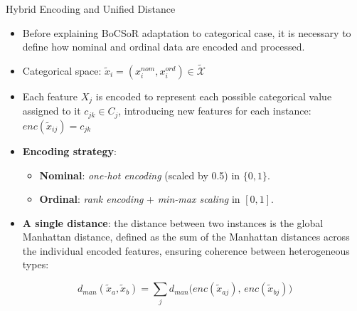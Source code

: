 \documentclass[10pt,aspectratio=169]{beamer}
\begin{document}
\begin{frame}{Hybrid Encoding and Unified Distance}
  \begin{itemize}\small
    \item Before explaining BoCSoR adaptation to categorical case, it is necessary to define how nominal and ordinal data are encoded and processed.
    \item Categorical space: $\tilde{x}_i = (x_i^{nom}, x_i^{ord}) \in \tilde{\mathcal{X}}$
    \item Each feature $X_j$ is encoded to represent each possible categorical value assigned to it $c_{jk} \in C_j$, introducing new features for each instance: $enc(\tilde{x}_{ij}) = c_{jk}$
    \item \textbf{Encoding strategy}:
      \begin{itemize}
        \item \textbf{Nominal}: \emph{one-hot encoding} (scaled by 0.5) in $\{0, 1\}$.
        \item \textbf{Ordinal}: \emph{rank encoding} + \emph{min-max scaling} in $[0, 1]$.
      \end{itemize}
    \item \textbf{A single distance}: the distance between two instances is the global Manhattan distance, defined as the sum of the Manhattan distances across the individual encoded features, ensuring coherence between heterogeneous types:
  \end{itemize}
  \begin{equation*}
    d_{man}(\tilde{x}_a, \tilde{x}_b) = \sum_j d_{man}\bigl(enc(\tilde{x}_{aj}),\, enc(\tilde{x}_{bj})\bigr)
  \end{equation*}
\end{frame}
\end{document}
